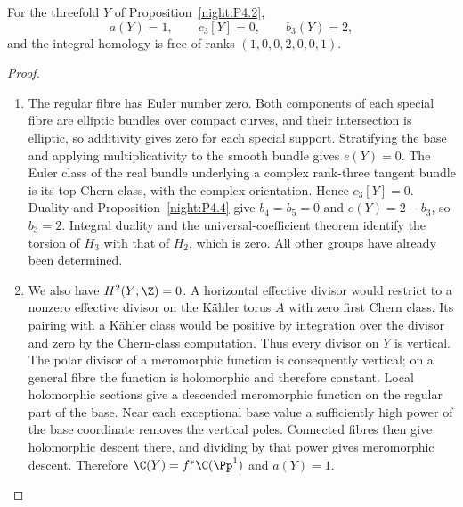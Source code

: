\begin{proposition}\hypertarget{tag-02XO}{}\label{night:P4.5}\label{stmt:P4.5}

For the threefold $Y$ of Proposition~\ref{night:P4.2},
\[
 a(Y)=1,\qquad c_3[Y]=0,\qquad b_3(Y)=2,
\]
and the integral homology is free of ranks $(1,0,0,2,0,0,1)$.
\end{proposition}
\begin{proof}

\begin{enumerate}[label={$\langle1\rangle$\arabic*.},leftmargin=*]
\item The regular fibre has Euler number zero. Both components of each special
fibre are elliptic bundles over compact curves, and their intersection is
elliptic, so additivity gives zero for each special support. Stratifying
the base and applying multiplicativity to the smooth bundle gives
$e(Y)=0$. The Euler class of the real bundle underlying a complex
rank-three tangent bundle is its top Chern class, with the complex
orientation. Hence $c_3[Y]=0$. Duality and Proposition~\ref{night:P4.4} give $b_4=b_5=0$ and
$e(Y)=2-b_3$, so $b_3=2$. Integral duality and the universal-coefficient
theorem identify the torsion of $H_3$ with that of $H_2$, which is zero.
All other groups have already been determined.

\item We also have $H^2(Y;\Z)=0$. A horizontal effective divisor would restrict
to a nonzero effective divisor on the Kähler torus $A$ with zero first
Chern class. Its pairing with a Kähler class would be positive by
integration over the divisor and zero by the Chern-class computation.
Thus every divisor on $Y$ is vertical. The polar divisor of a meromorphic
function is consequently vertical; on a general fibre the function is
holomorphic and therefore constant. Local holomorphic sections give a
descended meromorphic function on the regular part of the base. Near
each exceptional base value a sufficiently high power of the base
coordinate removes the vertical poles. Connected fibres then give
holomorphic descent there, and dividing by that power gives meromorphic
descent. Therefore $\C(Y)=f^*\C(\Pp^1)$ and $a(Y)=1$.

\end{enumerate}
\end{proof}
